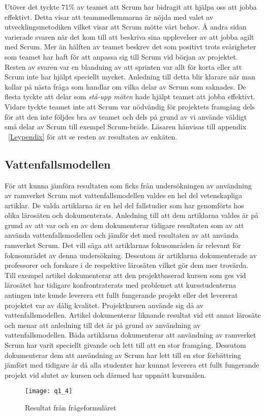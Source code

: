 Utöver det tyckte 71\% av teamet att Scrum har bidragit att hjälpa oss att jobba effektivt. Detta visar att teammedlemmarna är nöjda med valet av utvecklingsmetodiken vilket visar att Scrum mötte vårt behov. Å andra sidan varierade svaren när det kom till att beskriva sina upplevelser av att jobba agilt med Scrum. Mer än hälften av teamet beskrev det som positivt trots svårigheter som teamet har haft för att anpassa sig till Scrum vid början av projektet. Resten av svaren var en blandning av att sprinten var allt för korta eller att Scrum inte har hjälpt speciellt mycket. Anledning till detta blir klarare när man kollar på nästa fråga som handlar om vilka delar av Scrum som saknades. De flesta tyckte att delar som \textit{stå-upp möten} hade  hjälpt teamet att jobba effektivt. Vidare tyckte teamet inte att Scrum var nödvändig för projektets framgång dels för att den inte följdes bra av teamet och dels på grund av vi använde väldigt små delar av Scrum till exempel Scrum-bräde.
Läsaren hänvisas till appendix ~\ref{Leypendix} för att se resten av resultaten av enkäten.

\subsection{Vattenfallsmodellen}
För att kunna jämföra resultaten som ficks från undersökningen av användning av ramverket Scrum mot vattenfallsmodellen valdes en hel del vetenskapliga artiklar. De valda artiklarna är en hel del fallstudier som har genomförts hos olika lärosäten och dokumenterats. Anledning till att dem artiklarna valdes är på grund av att var och en av dem dokumenterar tidigare resultaten som av att använda vattenfallsmodellen och jämför det med resultaten av att använda ramverket Scrum. Det vill säga att artiklarnas fokusområden är relevant för fokusområdet av denna undersökning. Dessutom är artiklarna dokumenterade av professorer och forskare i de respektive lärosäten vilket gör dem mer trovärda. Till exempel artikel \cite{Usingscr27:online} dokumenterar att den projektbaserad kursen som ges vid lärosätet har tidigare konfrontraterats med problemet att kursstudenterna antingen inte kunde leverera ett fullt fungerande projekt eller det levererat projektet var av dålig kvalitet. Projektkursen använde sig då av vattenfallsmodellen. Artikel \cite{GameDesign} dokumenterar liknande resultat vid ett annat lärosäte och menar att anledning till det är på grund av användning av vattenfallsmodellen. Båda artiklarna dokumenterar att användning av ramverket Scrum har varit speciellt givande och lett till att en stor framgång. Dessutom dokumenterar dem att användning av Scrum har lett till en stor förbättring jämfört med tidigare år då alla studenter har kunnat leverera ett fullt fungerande projekt vid slutet av kursen och därmed har uppnått kursmålen.
\\
\begin{figure*}[h]
	\centering
	\texttt{[image: q1\_4]}
	\caption{Resultat från frågeformuläret}\label{fig1}
	\label{q1}
\end{figure*}
\newpage